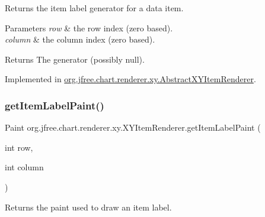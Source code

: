 Returns the item label generator for a data item.


\begin{DoxyParams}{Parameters}
{\em row} & the row index (zero based). \\
\hline
{\em column} & the column index (zero based).\\
\hline
\end{DoxyParams}
\begin{DoxyReturn}{Returns}
The generator (possibly {\ttfamily null}). 
\end{DoxyReturn}


Implemented in \mbox{\hyperlink{classorg_1_1jfree_1_1chart_1_1renderer_1_1xy_1_1_abstract_x_y_item_renderer_ab27f431c89d3468100e51b8091d4e570}{org.\+jfree.\+chart.\+renderer.\+xy.\+Abstract\+X\+Y\+Item\+Renderer}}.

\mbox{\label{interfaceorg_1_1jfree_1_1chart_1_1renderer_1_1xy_1_1_x_y_item_renderer_a7d88654e2caaf90b994ebab7a5fe0abf}} 
\subsubsection{\texorpdfstring{get\+Item\+Label\+Paint()}{getItemLabelPaint()}\hspace{0.1cm}{\footnotesize\ttfamily [1/2]}}
{\footnotesize\ttfamily Paint org.\+jfree.\+chart.\+renderer.\+xy.\+X\+Y\+Item\+Renderer.\+get\+Item\+Label\+Paint (\begin{DoxyParamCaption}\item[{int}]{row,  }\item[{int}]{column }\end{DoxyParamCaption})}

Returns the paint used to draw an item label.


